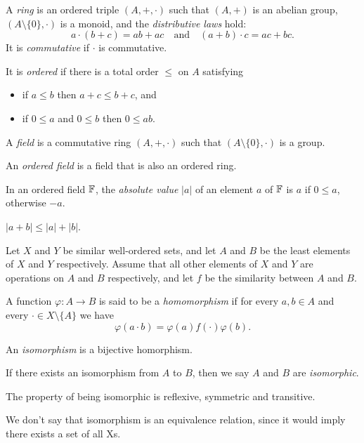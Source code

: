   \begin{defn}
    A \emph{ring} is an ordered triple $(A,+,\cdot)$ such that $(A,+)$ is an
    abelian group, $(A\setminus \{0\},\cdot)$ is a monoid, and the
    \emph{distributive laws} hold:
    \[a\cdot(b+c)=ab+ac\quad\text{and}\quad (a+b)\cdot c=ac+bc.\]
    It is \emph{commutative} if $\cdot$ is commutative.

    It is \emph{ordered} if there is a total order $\le$ on $A$ satisfying
    \begin{itemize}
      \item if $a\le b$ then $a+c\le b+c$, and
      \item if $0\le a$ and $0\le b$ then $0\le ab$.
    \end{itemize}
  \end{defn}
  \begin{defn}
    A \emph{field} is a commutative ring $(A,+,\cdot)$ such that $(A\setminus
    \{0\},\cdot)$ is a group.

    An \emph{ordered field} is a field that is also an ordered ring.
  \end{defn}
  \begin{defn}
    In an ordered field $\mathbb{F}$, the \emph{absolute value} $|a|$ of an element $a$
    of $\mathbb{F}$ is $a$ if $0\le a$, otherwise $-a$.
  \end{defn}
  \begin{prop}
    $|a+b|\le|a|+|b|$.
  \end{prop}
  \begin{defn}
    Let $X$ and $Y$ be similar well-ordered sets, and let $A$ and $B$ be the
    least elements of $X$ and $Y$ respectively. Assume that all other elements
    of $X$ and $Y$ are operations on $A$ and $B$ respectively, and let $f$ be
    the similarity between $A$ and $B$.

    A function $\varphi:A\to B$ is said
    to be a \emph{homomorphism} if
    for every $a,b\in A$ and every $\cdot\in X\setminus \{A\}$ we
    have \[\varphi(a\cdot b)=\varphi(a) f(\cdot) \varphi(b).\]

    An \emph{isomorphism} is a bijective homorphism.

    If there exists an isomorphism from $A$ to $B$, then we say $A$ and $B$ are
    \emph{isomorphic}.
  \end{defn}
  \begin{prop}
    The property of being isomorphic is reflexive, symmetric and transitive.
  \end{prop}
  \begin{rem}
    We don't say that isomorphism is an equivalence relation, since it would
    imply there exists a set of all Xs.
  \end{rem}
